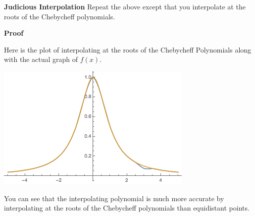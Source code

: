 \textbf{Judicious Interpolation} Repeat the above except that you interpolate at the roots of the Chebycheff polynomials.

\textbf{Proof}

Here is the plot of interpolating at the roots of the Chebycheff Polynomials along with the actual graph of $f(x)$. 

\includegraphics[scale = .5]{runge2.png}

You can see that the interpolating polynomial is much more accurate by interpolating at the roots of the Chebycheff polynomials than equidistant points.
